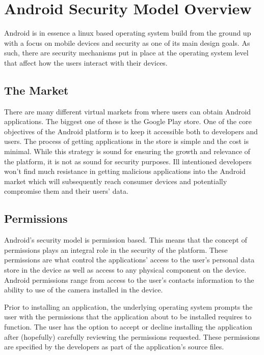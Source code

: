 \documentclass[conference]{IEEEtran}
\begin{document}
\section{Android Security Model Overview}

Android is in essence a linux based operating system build from the ground up with a focus on mobile devices and security as one of its main design goals. As such, there are security mechanisms put in place at the operating system level that affect how the users interact with their devices.

\subsection{The Market}

There are many different virtual markets from where users can obtain Android applications. The biggest one of these is the Google Play store. One of the core objectives of the Android platform is to keep it accessible both to developers and users. The process of getting applications in the store is simple and the cost is minimal. While this strategy is sound for ensuring the growth and relevance of the platform, it is not as sound for security purposes. Ill intentioned developers won't find much resistance in getting malicious applications into the Android market which will subsequently reach consumer devices and potentially compromise them and their users' data.

\subsection{Permissions}

Android's security model is permission based. This means that the concept of permissions plays an integral role in the security of the platform. These permissions are what control the applications' access to the user's personal data store in the device as well as access to any physical component on the device. Android permissions range from access to the user's contacts information to the ability to use of the camera installed in the device.

Prior to installing an application, the underlying operating system prompts the user with the permissions that the application about to be installed requires to function. The user has the option to accept or decline installing the application after (hopefully) carefully reviewing the permissions requested. These permissions are specified by the developers as part of the application's source files.
\end{document}
